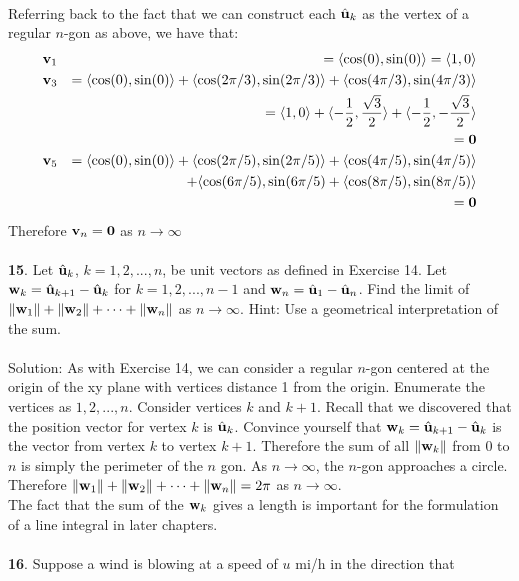 \documentclass[12pt]{amsbook}
\newcommand{\la}{\langle}
\newcommand{\ra}{\rangle}
\begin{document}
\\
Referring back to the fact that we can construct each  $\hat{\bf u}_k$ as the vertex of a regular $n$-gon as above, we have that:
\begin{eqnarray*}
{\bf v}_1&&=\la \cos(0),\sin(0) \ra = \la 1,0 \ra \\
{\bf v}_3&&=\la \cos(0),\sin(0) \ra + \la \cos(2\pi/3), \sin(2\pi/3) \ra + \la \cos(4\pi/3), \sin(4\pi/3) \ra\\
&&= \la 1,0 \ra + \la -\frac 12, \frac{\sqrt{3}}{2} \ra + \la -\frac 12, -\frac{\sqrt{3}}{2} \ra \\
&&= \bf 0 \\
{\bf v}_5&&=\la \cos(0),\sin(0) \ra + \la \cos(2\pi/5), \sin(2\pi/5) \ra + \la \cos(4\pi/5), \sin(4\pi/5) \ra \\
&&+ \la \cos(6\pi/5), \sin(6\pi/5)+ \la \cos(8\pi/5), \sin(8\pi/5) \ra\\
&&= \bf 0
\end{eqnarray*}
Therefore ${\bf v}_n=\bf 0$ as $n \rightarrow \infty$
\\
\\
{\small\bf 15}. Let $\hat{\bf u}_k$, $k=1,2,...,n$, be unit 
vectors as defined in Exercise 14. 
Let ${\bf w}_k =\hat{\bf u}_{k+1}-\hat{\bf u}_{k}$
for $k=1,2,...,n-1$ and ${\bf w}_n=
\hat{\bf u}_1-\hat{\bf u}_n$. Find the limit
of $\|{\bf w}_1\|+\|{\bf w}_2\|+\cdots+\|{\bf w}_n\|$
as $n\rightarrow \infty$. Hint: Use a geometrical interpretation
of the sum.\\ 
\\
{\sc Solution}: As with Exercise 14, we can consider a regular $n$-gon centered at the origin of the xy plane with vertices distance 1 from the origin. Enumerate the vertices as $1,2,...,n$. Consider vertices $k$ and $k+1$. Recall that we discovered that the position vector for vertex $k$ is $\hat{\bf u}_k$. Convince yourself that ${\bf w}_k=\hat{\bf u}_{k+1} - \hat{\bf u}_k$ is the vector from vertex $k$ to vertex $k+1$. Therefore the sum of all $\|{\bf w}_k\|$ from $0$ to $n$ is simply the perimeter of the $n$ gon. As $n \rightarrow \infty$, the $n$-gon approaches a circle. Therefore $\|{\bf w}_1\|+\|{\bf w}_2\|+\cdots+\|{\bf w}_n\| = 2\pi$ as $n \rightarrow \infty$.
\\
The fact that the sum of the ${\bf w}_k$ gives a length is important for the formulation of a line integral in later chapters.
\\
\\
{\small\bf 16}. Suppose a wind is blowing at a speed of $u$ mi/h 
in the direction that
\end{document}
